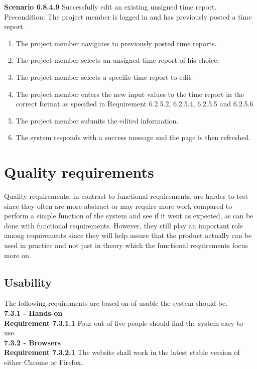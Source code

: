 \documentclass{article}
\begin{document}
\noindent\textbf{Scenario 6.8.4.9} Successfully edit an existing unsigned time report. \\
Precondition: The project member is logged in and has previously posted a time report.
\begin{enumerate}
\item The project member navigates to previously posted time reports.
\item The project member selects an unsigned time report of his choice. 
\item The project member selects a specific time report to edit.
\item The project member enters the new input values to the time report in the correct format as specified in Requirement 6.2.5.2, 6.2.5.4, 6.2.5.5 and 6.2.5.6
\item The project member submits the edited information.
\item The system responds with a success message and the page is then refreshed.
\end{enumerate}

\section{Quality requirements}

Quality requirements, in contrast to functional requirements, are harder to test since they often are more abstract or may require more work compared to perform a simple function of the system and see if it went as expected, as can be done with functional requirements. However, they still play an important role among requirements since they will help assure that the product actually can be used in practice and not just in theory which the functional requirements focus more on.

\setcounter{subsection}{2}
\subsection{Usability}
The following requirements are based on of usable the system should be.\\

{\fontsize{11}{11}\selectfont \noindent\textbf{7.3.1 - Hands-on}} \\
\noindent\textbf{Requirement 7.3.1.1} 
Four out of five people should find the system easy to use. \\

{\fontsize{11}{11}\selectfont \noindent\textbf{7.3.2 - Browsers}} \\
\textbf{Requirement 7.3.2.1} 
The website shall work in the latest stable version of either Chrome or Firefox.\\
\end{document}
